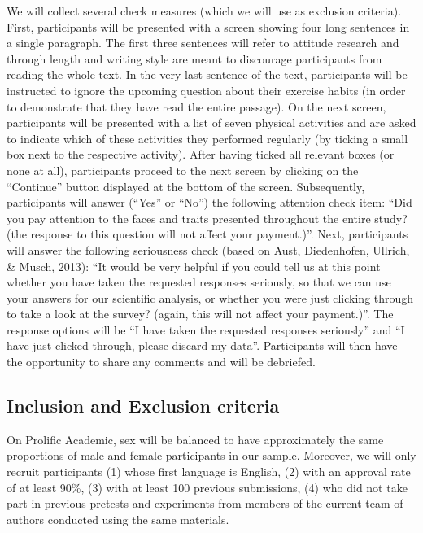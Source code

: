 \documentclass[
  doc,floatsintext]{apa6}
\begin{document}
We will collect several check measures (which we will use as exclusion criteria).
First, participants will be presented with a screen showing four long sentences in a single paragraph.
The first three sentences will refer to attitude research and through length and writing style are meant to discourage participants from reading the whole text.
In the very last sentence of the text, participants will be instructed to ignore the upcoming question about their exercise habits (in order to demonstrate that they have read the entire passage).
On the next screen, participants will be presented with a list of seven physical activities and are asked to indicate which of these activities they performed regularly (by ticking a small box next to the respective activity).
After having ticked all relevant boxes (or none at all), participants proceed to the next screen by clicking on the ``Continue'' button displayed at the bottom of the screen.
Subsequently, participants will answer (``Yes'' or ``No'') the following attention check item: ``Did you pay attention to the faces and traits presented throughout the entire study? (the response to this question will not affect your payment.)''.
Next, participants will answer the following seriousness check (based on Aust, Diedenhofen, Ullrich, \& Musch, 2013): ``It would be very helpful if you could tell us at this point whether you have taken the requested responses seriously, so that we can use your answers for our scientific analysis, or whether you were just clicking through to take a look at the survey? (again, this will not affect your payment.)''.
The response options will be ``I have taken the requested responses seriously'' and ``I have just clicked through, please discard my data''.
Participants will then have the opportunity to share any comments and will be debriefed.

\hypertarget{inclusion-and-exclusion-criteria}{%
\subsection{Inclusion and Exclusion criteria}\label{inclusion-and-exclusion-criteria}}

On Prolific Academic, sex will be balanced to have approximately the same proportions of male and female participants in our sample.
Moreover, we will only recruit participants (1) whose first language is English, (2) with an approval rate of at least 90\%, (3) with at least 100 previous submissions, (4) who did not take part in previous pretests and experiments from members of the current team of authors conducted using the same materials.
\end{document}
